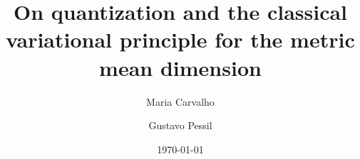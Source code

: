 \documentclass[11pt,a4paper,reqno]{amsart}
\theoremstyle{plain}
\theoremstyle{definition}
\begin{document}
\title[Quantization and the classical variational principle]{On quantization and the classical variational principle for the metric mean dimension}


\author[M. Carvalho]{Maria Carvalho}
\address{CMUP \& Departamento de Matem\'atica, Faculdade de Ci\^encias da Universidade do Porto, Rua do Campo Alegre 687, Porto, Portugal.}

\author[G. Pessil]{Gustavo Pessil}
\address{Institute of Mathematics of the Polish Academy of Sciences,  Śniadeckich 8, Warsaw,
00-656, Poland.}




\date{\today}
\end{document}
